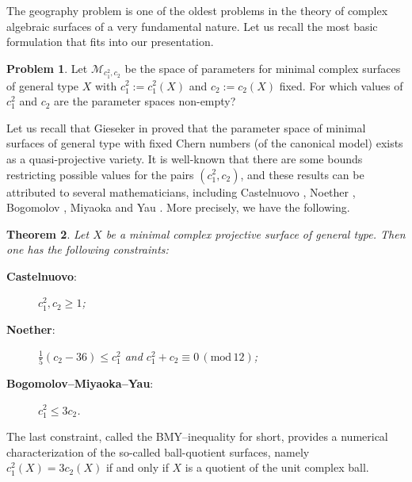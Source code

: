 \documentclass{article}
\theoremstyle{plain}
\newtheorem{thm}{Theorem}[section]
\theoremstyle{definition}
\newtheorem{problem}[thm]{Problem}
\numberwithin{equation}{section}
\begin{document}
The geography problem is one of the oldest problems in the theory of complex algebraic surfaces of a very fundamental nature. Let us recall the most basic formulation that fits into our presentation.
\begin{problem}
Let $\mathcal{M}_{c_{1}^{2}, c_{2}}$ be the space of parameters for minimal complex surfaces of general type $X$ with $c_{1}^{2}:=c_{1}^{2}(X)$ and $c_{2}:=c_{2}(X)$ fixed. For which values of $c_{1}^{2}$ and $c_{2}$ are the parameter spaces non-empty?
\end{problem}
Let us recall that Gieseker in \cite{G77} proved that the parameter space of minimal surfaces of general type with fixed Chern numbers (of the canonical model) exists as a quasi-projective variety.
It is well-known that there are some bounds restricting possible values for the pairs $(c_{1}^{2},c_{2})$, and these results can be attributed to several mathematicians, including Castelnuovo \cite{Cast}, Noether \cite{MN}, Bogomolov \cite{Bog}, Miyaoka \cite{Miyaoka77} and Yau \cite{Yau}. More precisely, we have the following.
\begin{thm}
Let $X$ be a minimal complex projective surface of general type. Then one has the following constraints:

\begin{description}
    \item[\textbf{Castelnuovo}:] $c_{1}^{2}, c_{2} \geq 1$;
    \item[\textbf{Noether}:] $\frac{1}{5}(c_{2}-36)\leq c_{1}^{2}$ and $c_{1}^{2} + c_{2} \equiv 0 \, (\textrm{mod} \, 12)$;
    \item[\textbf{Bogomolov--Miyaoka--Yau}:] $c_{1}^{2}\leq 3c_{2}$.
\end{description}
\end{thm}
The last constraint, called the BMY--inequality for short, provides a numerical characterization of the so-called ball-quotient surfaces, namely $c_{1}^{2}(X) = 3c_{2}(X)$ if and only if $X$ is a quotient of the unit complex ball. 
\end{document}
